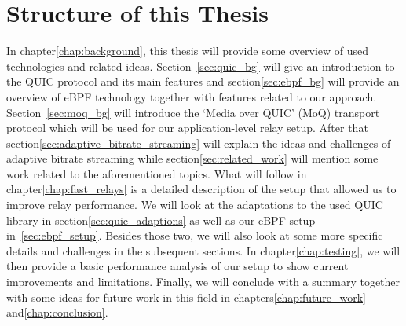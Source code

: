\section{Structure of this Thesis}\label{sec:structure_of_thesis}

In chapter\nobreakspace\ref{chap:background}, this thesis will provide some overview of used technologies
and related ideas.
Section~\ref{sec:quic_bg} will give an introduction to the QUIC protocol and its main features and 
section\nobreakspace\ref{sec:ebpf_bg} will provide an overview of eBPF technology together with features related to 
our approach.
Section~\ref{sec:moq_bg} will introduce the `Media over QUIC' (MoQ) transport protocol which will be used 
for our application-level relay setup.
After that section\nobreakspace\ref{sec:adaptive_bitrate_streaming} will explain the ideas and challenges of 
adaptive bitrate streaming while section\nobreakspace\ref{sec:related_work} will mention some work related to 
the aforementioned topics.
What will follow in chapter\nobreakspace\ref{chap:fast_relays} is a detailed description of the setup that 
allowed us to improve relay performance. 
We will look at the adaptations to the used QUIC library in section\nobreakspace\ref{sec:quic_adaptions} as well as 
our eBPF setup in~\ref{sec:ebpf_setup}. Besides those two, we will also look at some more specific details and 
challenges in the subsequent sections.
In chapter\nobreakspace\ref{chap:testing}, we will then provide a basic performance analysis of our setup to show current improvements and limitations.
Finally, we will conclude with a summary together with some ideas for future work in this field in chapters\nobreakspace\ref{chap:future_work} 
and\nobreakspace\ref{chap:conclusion}.
